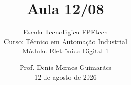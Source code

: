 
\title{Aula 12/08}

\subtitle{
\vspace{1.0cm}
Escola Tecnológica FPFtech\\
\vspace{0.5cm}
Curso: Técnico em Automação Industrial\\
\vspace{0.5cm}
Módulo: Eletrônica Digital 1
\vspace{1.0cm}
}

\author{
Prof. Denis Moraes Guimarães\\
\small 12 de agosto de 2026
}

\date{}